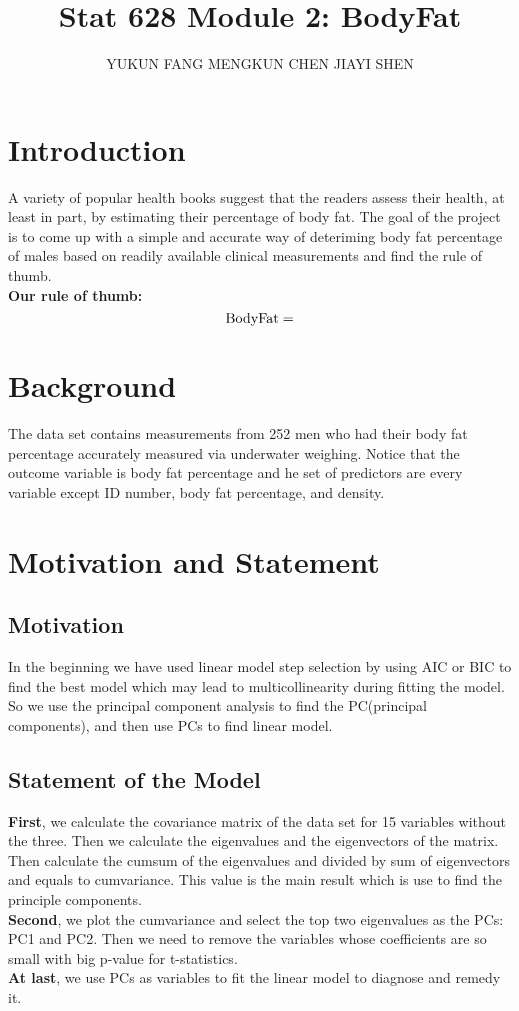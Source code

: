 \documentclass[12pt]{article}
\title{\vspace{-4em}Stat 628 Module 2: BodyFat}
\author{YUKUN FANG \quad MENGKUN CHEN \quad JIAYI SHEN}
\date{}
\begin{document}
\sffamily

\maketitle
\section{\sffamily Introduction}
A variety of popular health books suggest that the readers assess their 
health, at least in part, by estimating their percentage of body fat.
The goal of the project is to come up with 
a simple and accurate way of deteriming body fat percentage of males
based on readily available clinical measurements and find the rule of thumb.\\
\textbf{Our rule of thumb:} $$ {\rm BodyFat} = $$
\section{\sffamily Background}
The data set contains measurements from 252 men who had their body fat 
percentage accurately measured via underwater weighing. Notice that the 
outcome variable is body fat percentage and he set of predictors are 
every variable except ID number, body fat percentage, and density.
\section{\sffamily Motivation and Statement}
\subsection{\sffamily Motivation}
In the beginning we have used linear model step selection by using 
AIC or BIC to find the best model which may lead to multicollinearity during fitting the model.
So we use the principal component analysis to find the PC(principal components), and
then use PCs to find linear model.

\subsection{\sffamily Statement of the Model}
\textbf{First}, we calculate the covariance matrix of the data set for 15 variables without the three.
Then we calculate the eigenvalues and the eigenvectors of the matrix.
Then calculate the cumsum of the eigenvalues and divided by sum of eigenvectors and equals to cumvariance. 
This value is the main result which is use to find the principle components.\\
\textbf{Second}, we plot the cumvariance and select the top two eigenvalues as the PCs: PC1 and PC2.
Then we need to remove the variables whose coefficients are so small with big p-value for t-statistics.\\
\textbf{At last}, we use PCs as variables to fit the linear model to diagnose and remedy it.
\end{document}
